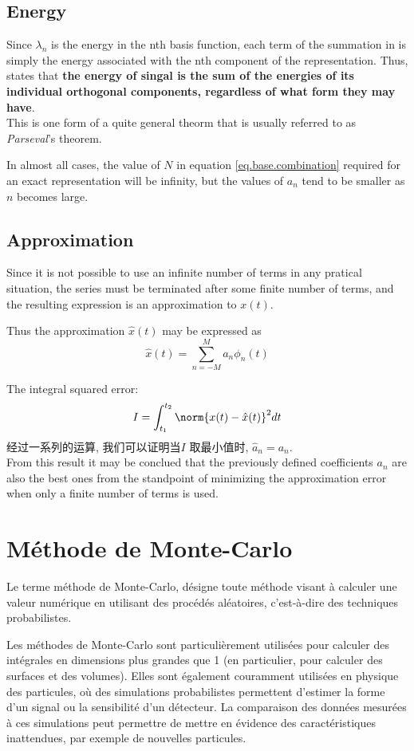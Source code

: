 \documentclass{article}
\begin{document}
\subsection{Energy}
Since $\lambda_n$ is the energy in the nth basis function, 
each term of the summation in \lasteq is simply the energy associated with the nth component of the representation. 
Thus, \lasteq states that \textbf{the energy of singal is the sum of the energies of its individual orthogonal components, regardless of what form they may have}. \\
This is one form of a quite general theorm that is usually referred to as \textit{Parseval}'s theorem.

In almost all cases, the value of $N$ in equation \eqref{eq.base.combination} required for an exact representation will be infinity,
but the values of $a_n$ tend to be smaller as $n$ becomes large. 

\subsection{Approximation}
Since it is not possible to use an infinite number of terms in any pratical situation, 
the series must be terminated after some finite number of terms, and the resulting expression is an approximation to $x(t)$. 

Thus the approximation $\hat{x}(t)$ may be expressed as
\begin{equation}
\hat{x}(t) = \sum_{n = -M}^M a_n \phi_n(t)
\end{equation}

The integral squared error:
$$
I = \int_{t_1}^{t_2} \norm{x(t) - \hat{x}(t)}^2 dt
$$
经过一系列的运算, 我们可以证明当$I$ 取最小值时, $\hat{a}_n = a_n$.\\
From this result it may be conclued that the previously defined coefficients $a_n$ are also the best ones from the standpoint of minimizing the approximation error when only a finite number of terms is used.

\section{M\'ethode de Monte-Carlo}
Le terme m\'ethode de Monte-Carlo, d\'esigne toute m\'ethode visant \`a calculer une valeur num\'erique en utilisant des proc\'ed\'es al\'eatoires, c'est-\`a-dire des techniques probabilistes.

Les m\'ethodes de Monte-Carlo sont particuli\`erement utilis\'ees pour calculer des int\'egrales en dimensions plus grandes que 1 (en particulier, pour calculer des surfaces et des volumes). Elles sont \'egalement couramment utilis\'ees en physique des particules, o\`u des simulations probabilistes permettent d'estimer la forme d'un signal ou la sensibilit\'e d'un d\'etecteur. La comparaison des donn\'ees mesur\'ees \`a ces simulations peut permettre de mettre en \'evidence des caract\'eristiques inattendues, par exemple de nouvelles particules.
\end{document}
